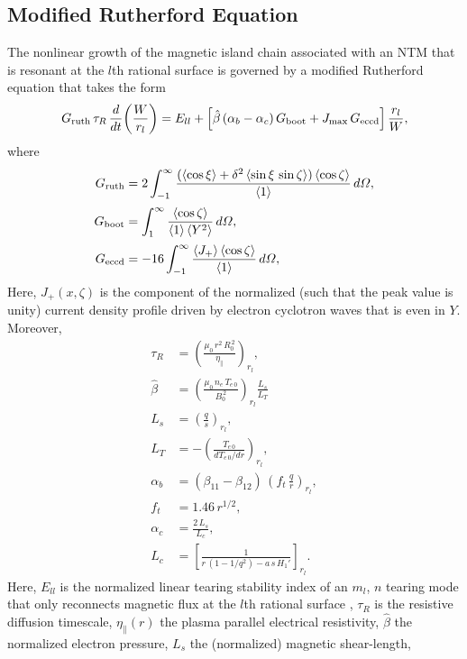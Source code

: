 \documentclass{iopjournal}
\begin{document}
\subsection{Modified Rutherford Equation}
The nonlinear growth of the magnetic island  chain associated with an NTM that is resonant at the $l$th rational surface is governed by a modified Rutherford equation that takes the
 form \cite{ntm1,ntm4,island,boot,fitz}
\begin{equation}\label{eruth}
G_{\rm ruth}\,\tau_R\,\frac{d}{dt}\!\left(\frac{W}{r_l}\right) = E_{ll} +\left[\hat{\beta}\,(\alpha_b-\alpha_c)\,G_{\rm boot} + J_{\rm max}\,G_{\rm eccd}\right]
\frac{r_l}{W},
\end{equation}
where
\begin{align}
G_{\rm ruth} &= 2\int_{-1}^\infty \frac{(\langle\cos\xi\rangle + \delta^2\,\langle \sin\xi\,\sin\zeta\rangle)\,\langle \cos\zeta\rangle}{\langle 1\rangle}\,d{\mit\Omega},\\[0.5ex]
G_{\rm boot} &= \int_1^\infty \frac{\langle \cos\zeta\rangle}{\langle 1\rangle\,\langle Y^2\rangle}\,d{\mit\Omega},\\[0.5ex]
G_{\rm eccd} &= - 16\int_{-1}^\infty \frac{\langle J_+\rangle\,\langle \cos\zeta\rangle}{\langle 1\rangle}\,d{\mit\Omega},\label{geccd}
\end{align}
Here,  $J_+(x,\zeta)$ is the component of the normalized  (such that the peak value is unity) current density profile driven by electron cyclotron waves that is even in $Y$. 
Moreover, 
\begin{align}
\tau_R &= \left(\frac{\mu_0\,r^2\,R_0^{\,2}}{\eta_\parallel}\right)_{r_l},\\[0.5ex]
\hat{\beta} &= \left(\frac{\mu_0\,n_e\,T_{e\,0}}{B_0^{\,2}}\right)_{r_l}\frac{L_s}{L_T}\,\\[0.5ex]
L_s&=\left(\frac{q}{s}\right)_{r_l},\\[0.5ex]
L_T &= -\left(\frac{T_{e\,0}}{dT_{e\,0}/dr}\right)_{r_l},\\[0.5ex]
\alpha_b &=(\beta_{11}-\beta_{12})\, \left(f_t\,\frac{q}{r}\right)_{r_l},\\[0.5ex]
f_t&= 1.46\,r^{1/2},\\[0.5ex]
\alpha_c &= \frac{2\,L_s}{L_c},\\[0.5ex]
L_c &= \left[\frac{1}{r\,(1-1/q^2) -a\,s\,H_1'}\right]_{r_l}.
\end{align}
Here, $E_{ll}$ is the  normalized linear tearing stability index of an $m_l$, $n$ tearing mode
 that only reconnects magnetic flux at the $l$th rational surface \cite{tear5}, $\tau_R$ is the resistive diffusion timescale, $\eta_\parallel(r)$  the plasma parallel electrical resistivity, $\hat{\beta}$ the normalized electron pressure, $L_s$  the (normalized) magnetic shear-length, 
\end{document}
